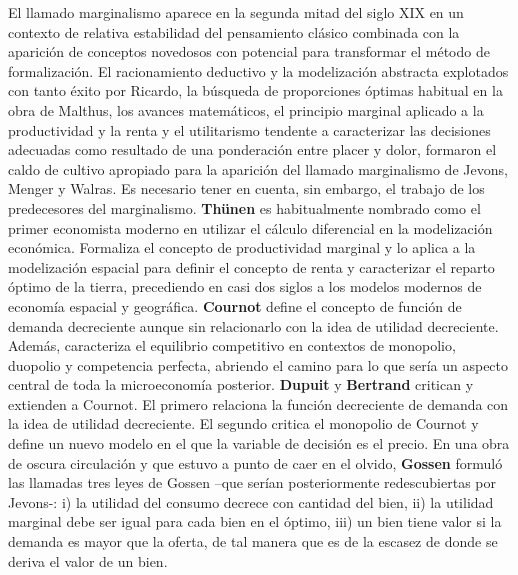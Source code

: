 \documentclass{nuevotema}
\begin{document}
El llamado marginalismo aparece en la segunda mitad del siglo XIX en un contexto de relativa estabilidad del pensamiento clásico combinada con la aparición de conceptos novedosos con potencial para transformar el método de formalización. El racionamiento deductivo y la modelización abstracta explotados con tanto éxito por Ricardo, la búsqueda de proporciones óptimas habitual en la obra de Malthus, los avances matemáticos, el principio marginal aplicado a la productividad y la renta y el utilitarismo tendente a caracterizar las decisiones adecuadas como resultado de una ponderación entre placer y dolor, formaron el caldo de cultivo apropiado para la aparición del llamado marginalismo de Jevons, Menger y Walras. Es necesario tener en cuenta, sin embargo, el trabajo de los predecesores del marginalismo. \textbf{Thünen} es habitualmente nombrado como el primer economista moderno en utilizar el cálculo diferencial en la modelización económica. Formaliza el concepto de productividad marginal y lo aplica a la modelización espacial para definir el concepto de renta y caracterizar el reparto óptimo de la tierra, precediendo en casi dos siglos a los modelos modernos de economía espacial y geográfica. \textbf{Cournot} define el concepto de función de demanda decreciente aunque sin relacionarlo con la idea de utilidad decreciente. Además, caracteriza el equilibrio competitivo en contextos de monopolio, duopolio y competencia perfecta, abriendo el camino para lo que sería un aspecto central de toda la microeconomía posterior. \textbf{Dupuit} y \textbf{Bertrand} critican y extienden a Cournot. El primero relaciona la función decreciente de demanda con la idea de utilidad decreciente. El segundo critica el monopolio de Cournot y define un nuevo modelo en el que la variable de decisión es el precio. En una obra de oscura circulación y que estuvo a punto de caer en el olvido, \textbf{Gossen} formuló las llamadas tres leyes de Gossen --que serían posteriormente redescubiertas por Jevons-: i) la utilidad del consumo decrece con cantidad del bien, ii) la utilidad marginal debe ser igual para cada bien en el óptimo, iii) un bien tiene valor si la demanda es mayor que la oferta, de tal manera que es de la escasez de donde se deriva el valor de un bien. 
\end{document}
